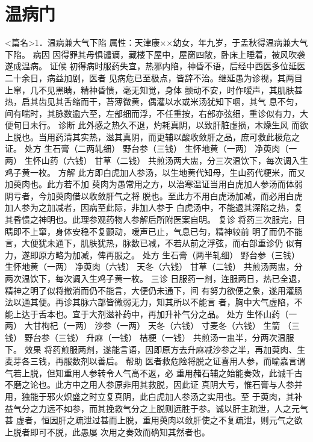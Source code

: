 \documentclass[a4paper,12pt,UTF8,twoside]{ctexbook}
\begin{document}
\chapter{温病门}
<篇名>1．温病兼大气下陷
属性：天津康××幼女，年九岁，于孟秋得温病兼大气下陷。 
病因 因得罪其母惧谴谪，藏楼下屋中，屋窗四敞，卧床上睡着，被风吹袭遂成温病。 
证候 初得病时服药失宜，热邪内陷，神昏不语，后经中西医多位延医二十余日，病益加剧，医者 
见病危已至极点，皆辞不治。继延愚为诊视，其两目上窜，几不见黑睛，精神昏愦，毫无知觉，身体 
颤动不安，时作嗳声，其肌肤甚热，启其齿见其舌缩而干，苔薄微黄，偶灌以水或米汤犹知下咽，其气 
息不匀，间有喘时，其脉数逾六至，左部细而浮，不任重按，右部亦弦细，重诊似有力，大便旬日未行。 
诊断 此外感之热久不退，灼耗真阴，以致肝脏虚损，木燥生风 
而欲上脱也。当用药清其实热，滋其真阴，而更辅以酸收敛肝之品，庶可救此极危之证。 
处方 生石膏（二两轧细） 野台参（三钱） 生怀地黄（一两） 净萸肉（一两） 
生怀山药（六钱） 甘草（二钱） 
共煎汤两大盅，分三次温饮下，每次调入生鸡子黄一枚。 
方解 此方即白虎加人参汤，以生地黄代知母，生山药代粳米，而又加萸肉也。此方若不加 
萸肉为愚常用之方，以治寒温证当用白虎加人参汤而体弱阴亏者，今加萸肉借以收敛肝气之将 
脱也。至此方不用白虎汤加减，而必用白虎加人参为之加减者，因病至此际，非加人参于 
白虎汤中，不能退其深陷之热，复其昏愦之神明也。此理参观药物人参解后所附医案自明。 
复诊 将药三次服完，目睛即不上窜，身体安稳不复颤动，嗳声已止，气息已匀，精神较前 
明了而仍不能言，大便犹未通下，肌肤犹热，脉数已减，不若从前之浮弦，而右部重诊仍 
似有力，遂即原方略为加减，俾再服之。 
处方 生石膏（两半轧细） 野台参（三钱） 生怀地黄（一两） 净萸肉（六钱） 
天冬（六钱） 甘草（二钱） 
共煎汤两盅，分两次温饮下，每次调入生鸡子黄一枚。 
三诊 日服药一剂，连服两日，热已全退，精神之明了似将撤消而仍不能言，大便仍未通下，间 
有努力欲便之象，遂用灌肠法以通其便。再诊其脉六部皆微弱无力，知其所以不能言 
者，胸中大气虚陷，不能上达于舌本也。宜于大剂滋补药中，再加升补气分之品。 
处方 生怀山药（一两） 大甘枸杞（一两） 沙参（一两） 天冬（六钱） 
寸麦冬（六钱） 生箭 （三钱） 野台参（三钱） 升麻（一钱） 桔梗（一钱） 
共煎汤一盅半，分两次温服下。 
效果 将药煎服两剂，遂能言语，因即原方去升麻减沙参之半，再加萸肉、生麦芽各三钱，再服数剂以善后。 
帮助 医者救危险将脱之证喜用人参，而喻嘉言谓气若上脱，但知重用人参转令人气高不返，必 
重用赭石辅之始能奏效，此诚千古不磨之论也。此方中之用人参原非用其救脱，因此证 
真阴大亏，惟石膏与人参并用，独能于邪火炽盛之时立复真阴，此白虎加人参汤之实用也。至 
于萸肉，其补益气分之力远不如参，而其挽救气分之上脱则远胜于参。诚以肝主疏泄，人之元气甚 
虚者，恒因肝之疏泄过甚而上脱，重用萸肉以敛肝使之不复疏泄，则元气之欲上脱者即可不脱，此愚屡 
次用之奏效而确知其然者也。 
\end{document}

